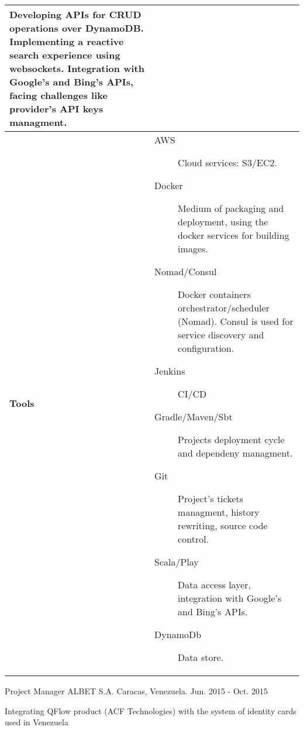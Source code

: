 \begin{cventries}
\begin{tabular}{|p{4.5cm} | p{2cm} | p{4cm} | p{2cm} | p{2cm}|}
{      Developing APIs for CRUD operations over DynamoDB. Implementing a reactive search experience using websockets. Integration with Google's and Bing's APIs, facing challenges like provider's API keys managment.

      } \\
 \hline
      \textbf{Tools} & \multicolumn{4}{p{12cm}|}{
                       \begin{description}
                       \item[AWS] Cloud services: S3/EC2.
                       \item[Docker] Medium of packaging and deployment, using the docker services for building images.

                       \item[Nomad/Consul]  Docker containers orchestrator/scheduler (Nomad). Consul is used for service discovery and configuration.
                       \item[Jenkins] CI/CD

                       \item[Gradle/Maven/Sbt] Projects deployment cycle and dependeny managment.
                       \item[Git]  Project's tickets managment, history rewriting, source code control.

                       \item[Scala/Play] Data access layer, integration with Google's and Bing's APIs.

                      \item[DynamoDb] Data store.

                       \end{description}
      } \\
 

    \hline

  \end{tabular}

\cventry
{Project Manager} %
{ALBET S.A.} %
{Caracas, Venezuela.} %
{Jun. 2015 - Oct. 2015} %
{ %
\begin{cvitems}
\item {Integrating QFlow product (ACF Technologies) with the system of identity cards used in Venezuela}
\end{cvitems}
}



\end{cventries}
